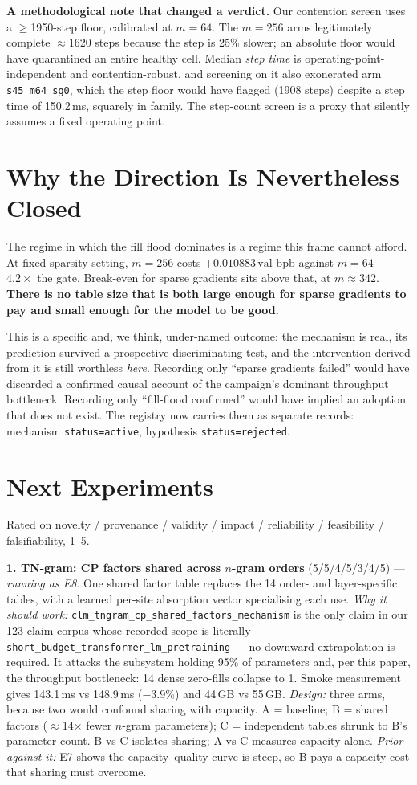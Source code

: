 \documentclass{article}
\newcommand{\vb}{\mathrm{val\_bpb}}
\begin{document}
\textbf{A methodological note that changed a verdict.} Our contention screen uses a $\ge$1950-step floor, calibrated at $m{=}64$. The $m{=}256$ arms legitimately complete $\approx$1620 steps because the step is 25\% slower; an absolute floor would have quarantined an entire healthy cell. Median \emph{step time} is operating-point-independent and contention-robust, and screening on it also exonerated arm \texttt{s45\_m64\_sg0}, which the step floor would have flagged (1908 steps) despite a step time of 150.2\,ms, squarely in family. The step-count screen is a proxy that silently assumes a fixed operating point.

\section{Why the Direction Is Nevertheless Closed}
The regime in which the fill flood dominates is a regime this frame cannot afford. At fixed sparsity setting, $m{=}256$ costs $+0.010883\,\vb$ against $m{=}64$ --- $4.2\times$ the gate. Break-even for sparse gradients sits above that, at $m\approx342$. \textbf{There is no table size that is both large enough for sparse gradients to pay and small enough for the model to be good.}

This is a specific and, we think, under-named outcome: the mechanism is real, its prediction survived a prospective discriminating test, and the intervention derived from it is still worthless \emph{here}. Recording only ``sparse gradients failed'' would have discarded a confirmed causal account of the campaign's dominant throughput bottleneck. Recording only ``fill-flood confirmed'' would have implied an adoption that does not exist. The registry now carries them as separate records: mechanism \texttt{status=active}, hypothesis \texttt{status=rejected}.

\section{Next Experiments}
Rated on novelty / provenance / validity / impact / reliability / feasibility / falsifiability, 1--5.

\textbf{1. TN-gram: CP factors shared across $n$-gram orders} (5/5/4/5/3/4/5) --- \emph{running as E8}. One shared factor table replaces the 14 order- and layer-specific tables, with a learned per-site absorption vector specialising each use. \emph{Why it should work:} \texttt{clm\_tngram\_cp\_shared\_factors\_mechanism} is the only claim in our 123-claim corpus whose recorded scope is literally \texttt{short\_budget\_transformer\_lm\_pretraining} --- no downward extrapolation is required. It attacks the subsystem holding 95\% of parameters and, per this paper, the throughput bottleneck: 14 dense zero-fills collapse to 1. Smoke measurement gives 143.1\,ms vs 148.9\,ms ($-3.9$\%) and 44\,GB vs 55\,GB. \emph{Design:} three arms, because two would confound sharing with capacity. A = baseline; B = shared factors ($\approx$14$\times$ fewer $n$-gram parameters); C = independent tables shrunk to B's parameter count. B vs C isolates sharing; A vs C measures capacity alone. \emph{Prior against it:} E7 shows the capacity--quality curve is steep, so B pays a capacity cost that sharing must overcome.
\end{document}
